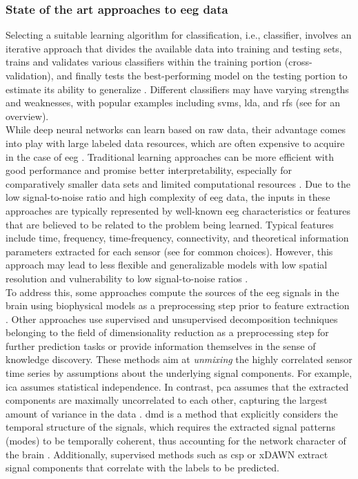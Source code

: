 \subsubsection{State of the art approaches to \gls{eeg} data}
\label{theory:ml:applications_eeg}
Selecting a suitable learning algorithm for classification, i.e., classifier, involves an iterative approach that divides the available data into training and testing sets, trains and validates various classifiers within the training portion (cross-validation), and finally tests the best-performing model on the testing portion to estimate its ability to generalize \cite{Hastie2009}. Different classifiers may have varying strengths and weaknesses, with popular examples including \glspl{svm}, \gls{lda}, and \glspl{rf} (see \cite{shoorangiz2021eeg} for an overview).\\
While deep neural networks can learn based on raw data, their advantage comes into play with large labeled data resources, which are often expensive to acquire in the case of \gls{eeg} \cite{Banville2021}. Traditional learning approaches can be more efficient with good performance and promise better interpretability, especially for comparatively smaller data sets and limited computational resources \cite{Gemein2020}. Due to the low signal-to-noise ratio and high complexity of \gls{eeg} data, the inputs in these approaches are typically represented by well-known \gls{eeg} characteristics or features that are believed to be related to the problem being learned. Typical features include time, frequency, time-frequency, connectivity, and theoretical information parameters extracted for each sensor (see \cite{Gemein2020} for common choices). However, this approach may lead to less flexible and generalizable models with low spatial resolution and vulnerability to low signal-to-noise ratios \cite{Saeidi2021}.\\
To address this, some approaches compute the sources of the \gls{eeg} signals in the brain using biophysical models as a preprocessing step prior to feature extraction \cite{Khan2018, Westner2018}. Other approaches use supervised and unsupervised decomposition techniques belonging to the field of dimensionality reduction as a preprocessing step for further prediction tasks or provide information themselves in the sense of knowledge discovery. These methods aim at \textit{unmixing} the highly correlated sensor time series by assumptions about the underlying signal components. For example, \gls{ica} assumes statistical independence. In contrast, \gls{pca} assumes that the extracted components are maximally uncorrelated to each other, capturing the largest amount of variance in the data \cite{CohenX2017}. \Gls{dmd} is a method that explicitly considers the temporal structure of the signals, which requires the extracted signal patterns (modes) to be temporally coherent, thus accounting for the network character of the brain \cite{Brunton2016}. Additionally, supervised methods such as \gls{csp} \cite{Blankertz2008} or xDAWN \cite{rivet2009xdawn} extract signal components that correlate with the labels to be predicted.\\
